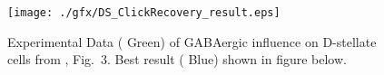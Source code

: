 
\begin{figure}[hp!]
  \centering
\texttt{[image: ./gfx/DS\_ClickRecovery\_result.eps]}
\caption{Experimental Data ({\color{green} Green}) of GABAergic influence on D-stellate cells from \citep{BackoffPalombiEtAl:1997}, Fig.~3.  Best result ({\color{blue} Blue}) shown in figure below. }
\label{fig:DS_ClickRecovery_result}  
\end{figure}







